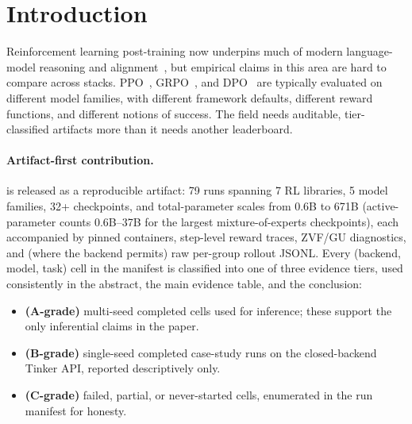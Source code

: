 \section{Introduction}
\label{sec:intro}

Reinforcement learning post-training now underpins much of modern
language-model reasoning and alignment~\citep{ouyang2022training,%
guo2025deepseekr1nature}, but empirical claims in this area are hard to
compare across stacks. PPO~\citep{schulman2017proximal},
GRPO~\citep{shao2024deepseekmath}, and DPO~\citep{rafailov2024direct} are
typically evaluated on different model families, with different framework
defaults, different reward functions, and different notions of success. The
field needs auditable, tier-classified artifacts more than it needs another
leaderboard.

\paragraph{Artifact-first contribution.}
\ours{} is released as a reproducible artifact: 79 runs spanning 7 RL
libraries, 5 model families, 32+ checkpoints, and total-parameter scales
from 0.6B to 671B (active-parameter counts 0.6B--37B for the largest
mixture-of-experts checkpoints), each accompanied by pinned containers,
step-level reward traces, ZVF/GU diagnostics, and (where the backend
permits) raw per-group rollout JSONL. Every (backend, model, task) cell
in the manifest is classified into one of three evidence tiers, used
consistently in the abstract, the main evidence table, and the
conclusion:
\begin{itemize}\setlength\itemsep{1pt}
  \item \textbf{(A-grade)} multi-seed completed cells used for inference;
        these support the only inferential claims in the paper.
  \item \textbf{(B-grade)} single-seed completed case-study runs on the
        closed-backend Tinker API, reported descriptively only.
  \item \textbf{(C-grade)} failed, partial, or never-started cells,
        enumerated in the run manifest for honesty.
\end{itemize}

